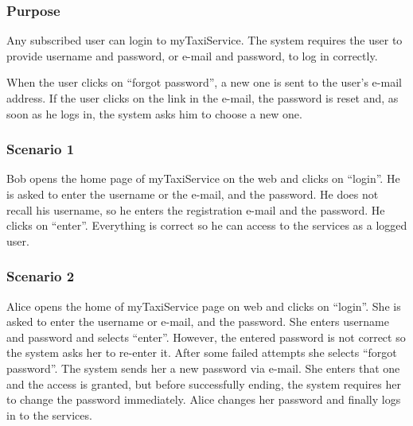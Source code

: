\label{user-login}
\subsubsection{Purpose}
Any subscribed user can login to myTaxiService.
The system requires the user to provide username and password, or e-mail and password, to log in correctly.

When the user clicks on ``forgot password'', a new one is sent to the user's e-mail address. If the user clicks on the link in the e-mail, the password is reset and, as soon as he logs in, the system asks him to choose a new one.

\subsubsection{Scenario 1}
Bob opens the home page of myTaxiService on the web and clicks on ``login''.
He is asked to enter the username or the e-mail, and the password. He does not recall his username, so he enters the registration e-mail and the password. He clicks on ``enter''.
Everything is correct so he can access to the services as a logged user.

\subsubsection{Scenario 2}
Alice opens the home of myTaxiService page on web and clicks on ``login''.
She is asked to enter the username or e-mail, and the password.
She enters username and password and selects ``enter''. However, the entered password is not correct so the system asks her to re-enter it.
After some failed attempts she selects ``forgot password''.
The system sends her a new password via e-mail. She enters that one and the access is granted, but before successfully ending, the system requires her to change the password immediately.
Alice changes her password and finally logs in to the services.

